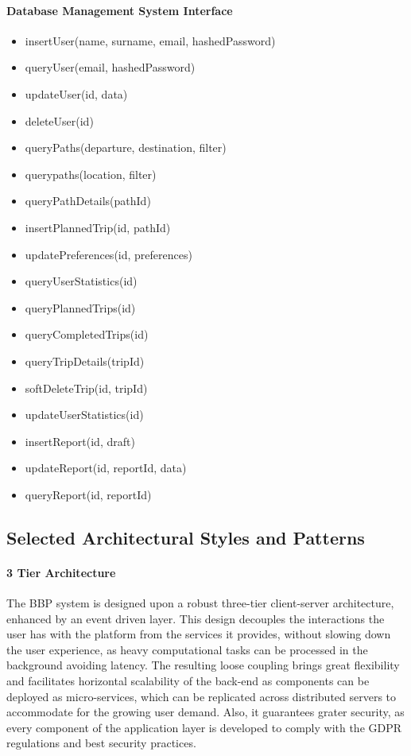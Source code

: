 \paragraph{Database Management System Interface}
\begin{itemize}
    \item insertUser(name, surname, email, hashedPassword)
    \item queryUser(email, hashedPassword)
    \item updateUser(id, data)
    \item deleteUser(id)
    \item queryPaths(departure, destination, filter)
    \item querypaths(location, filter)
    \item queryPathDetails(pathId)
    \item insertPlannedTrip(id, pathId)
    \item updatePreferences(id, preferences)
    \item queryUserStatistics(id)
    \item queryPlannedTrips(id)
    \item queryCompletedTrips(id)
    \item queryTripDetails(tripId)
    \item softDeleteTrip(id, tripId)
    \item updateUserStatistics(id)
    \item insertReport(id, draft)
    \item updateReport(id, reportId, data)
    \item queryReport(id, reportId)
\end{itemize}

\subsection{Selected Architectural Styles and Patterns}
\paragraph{3 Tier Architecture}
The BBP system is designed upon a robust three-tier client-server architecture, enhanced by an event driven layer. This design decouples the interactions the user has with the platform from the services it provides, without slowing down the user experience, as heavy computational tasks can be processed in the background avoiding latency. The resulting loose coupling brings great flexibility and facilitates horizontal scalability of the back-end as components can be deployed as micro-services, which can be replicated across distributed servers to accommodate for the growing user demand. Also, it guarantees grater security, as every component of the application layer is developed to comply with the GDPR regulations and best security practices.


